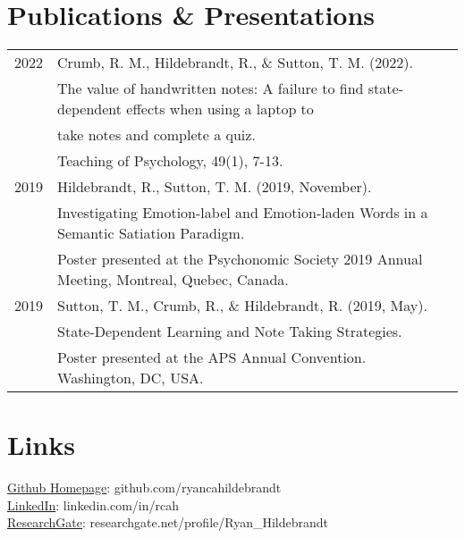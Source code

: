\documentclass[letterpaper]{deedy-resume} %
\begin{document}
\section{Publications \& Presentations} 
\begin{tabular}{rll}

2022 & Crumb, R. M., Hildebrandt, R., \& Sutton, T. M. (2022). \\ 
& The value of handwritten notes: A failure to find state-dependent effects when using a laptop to \\
& take notes and complete a quiz. \\
& Teaching of Psychology, 49(1), 7-13.\\

2019 & Hildebrandt, R., Sutton, T. M. (2019, November). \\ 
& Investigating Emotion-label and Emotion-laden Words in a Semantic Satiation Paradigm. \\
& Poster presented at the Psychonomic Society 2019 Annual Meeting, Montreal, Quebec, Canada. \\

2019 & Sutton, T. M., Crumb, R., \& Hildebrandt, R. (2019, May). \\
& State-Dependent Learning and Note Taking Strategies. \\
& Poster presented at the APS Annual Convention. Washington, DC, USA.\\

\end{tabular}
\sectionspace %

\section{Links} 
\href{https://github.com/ryancahildebrandt}{Github Homepage}: github.com/ryancahildebrandt \\
\href{https://linkedin.com/in/rcah}{LinkedIn}: linkedin.com/in/rcah \\
\href{https://researchgate.net/profile/Ryan\_Hildebrandt}{ResearchGate}: researchgate.net/profile/Ryan\_Hildebrandt 
\hfill
\end{document}
